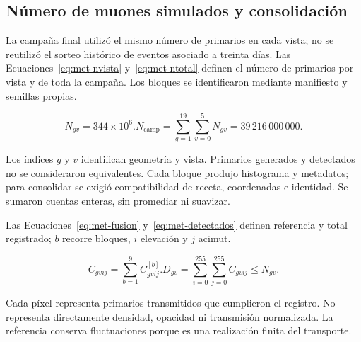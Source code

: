 \subsection{Número de muones simulados y consolidación}\label{subsec:met-campana}
La campaña final utilizó el mismo número de primarios en cada vista; no se reutilizó el sorteo histórico de eventos asociado a treinta días. Las Ecuaciones~\eqref{eq:met-nvista} y~\eqref{eq:met-ntotal} definen el número de primarios por vista y de toda la campaña. Los bloques se identificaron mediante manifiesto y semillas propias.
\begin{samepage}
\begin{subequations}
\begin{equation}N_{gv}=344\times10^6.\label{eq:met-nvista}\end{equation}
\begin{equation}N_{\mathrm{camp}}=\sum_{g=1}^{19}\sum_{v=0}^{5}N_{gv}=39\,216\,000\,000.\label{eq:met-ntotal}\end{equation}
\end{subequations}
\end{samepage}
Los índices $g$ y $v$ identifican geometría y vista. Primarios generados y detectados no se consideraron equivalentes. Cada bloque produjo histograma y metadatos; para consolidar se exigió compatibilidad de receta, coordenadas e identidad. Se sumaron cuentas enteras, sin promediar ni suavizar.

Las Ecuaciones~\eqref{eq:met-fusion} y~\eqref{eq:met-detectados} definen referencia y total registrado; $b$ recorre bloques, $i$ elevación y $j$ acimut.
\begin{samepage}
\begin{subequations}
\begin{equation}C_{gvij}=\sum_{b=1}^{9}C^{[b]}_{gvij}.\label{eq:met-fusion}\end{equation}
\begin{equation}D_{gv}=\sum_{i=0}^{255}\sum_{j=0}^{255}C_{gvij}\leq N_{gv}.\label{eq:met-detectados}\end{equation}
\end{subequations}
\end{samepage}
Cada píxel representa primarios transmitidos que cumplieron el registro. No representa directamente densidad, opacidad ni transmisión normalizada. La referencia conserva fluctuaciones porque es una realización finita del transporte.

